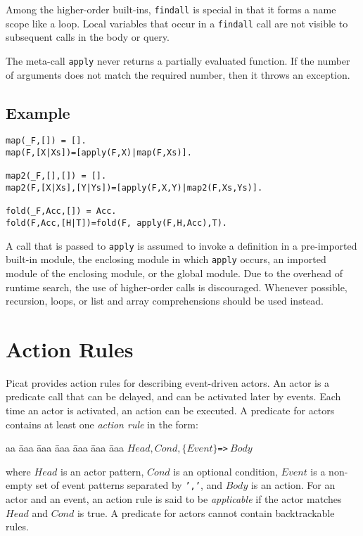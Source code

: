Among the higher-order built-ins, \texttt{findall} is special in that it forms a name scope like a loop. Local variables that occur in a \texttt{findall} call are not visible to subsequent calls in the body or query.

The meta-call \texttt{apply} never returns a partially evaluated function. If the number of arguments does not match the required number, then it throws an exception.

\subsection*{Example}
\begin{verbatim}
map(_F,[]) = [].
map(F,[X|Xs])=[apply(F,X)|map(F,Xs)].

map2(_F,[],[]) = [].
map2(F,[X|Xs],[Y|Ys])=[apply(F,X,Y)|map2(F,Xs,Ys)].

fold(_F,Acc,[]) = Acc.
fold(F,Acc,[H|T])=fold(F, apply(F,H,Acc),T).
\end{verbatim}

A call that is passed to \texttt{apply} is assumed to invoke a definition in a pre-imported built-in module, the enclosing module in which \texttt{apply} occurs, an imported module of the enclosing module, or the global module. Due to the overhead of runtime search, the use of higher-order calls is discouraged. Whenever possible, recursion, loops, or list and array comprehensions should be used instead.

\section{Action Rules}
Picat provides action rules for describing event-driven actors. An actor is a predicate call that can be delayed, and can be activated later by events. Each time an actor is activated, an action can be executed. A predicate for actors contains at least one \emph{action rule} in the form:
\begin{tabbing}
aa \= aaa \= aaa \= aaa \= aaa \= aaa \= aaa \kill
\> $Head, Cond, \{Event\} $\verb+=>+$\ Body$ 
\end{tabbing}
where $Head$ is an actor pattern, $Cond$ is an optional condition, $Event$ is a non-empty set of event patterns separated by \texttt{','},  and $Body$ is an action. For an actor and an event, an action rule is said to be \emph{applicable} if the actor matches $Head$ and $Cond$ is true. A predicate for actors cannot contain backtrackable rules.

